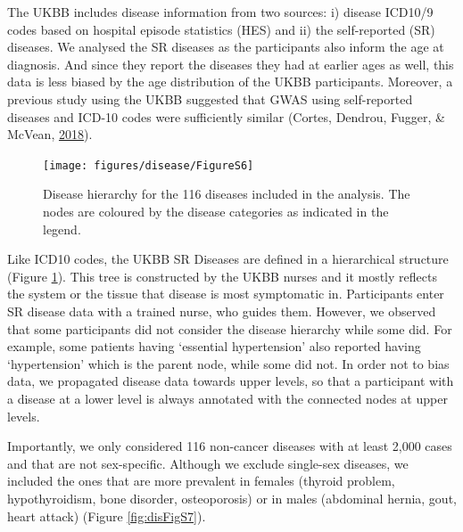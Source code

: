 \documentclass[12pt,twoside]{unicam}
\begin{document}
The UKBB includes disease information from two sources: i) disease ICD10/9 codes based on hospital episode statistics (HES) and ii) the self-reported (SR) diseases. We analysed the SR diseases as the participants also inform the age at diagnosis. And since they report the diseases they had at earlier ages as well, this data is less biased by the age distribution of the UKBB participants. Moreover, a previous study using the UKBB suggested that GWAS using self-reported diseases and ICD-10 codes were sufficiently similar (Cortes, Dendrou, Fugger, \& McVean, \protect\hyperlink{ref-Cortes2018}{2018}).

\begin{figure}

{\centering \texttt{[image: figures/disease/FigureS6]} 

}

\caption[Disease hierarchy for the 116 diseases included in the analysis.]{Disease hierarchy for the 116 diseases included in the analysis. The nodes are coloured by the disease categories as indicated in the legend.}\label{fig:disFigS6}
\end{figure}

Like ICD10 codes, the UKBB SR Diseases are defined in a hierarchical structure (Figure \ref{fig:disFigS6}). This tree is constructed by the UKBB nurses and it mostly reflects the system or the tissue that disease is most symptomatic in. Participants enter SR disease data with a trained nurse, who guides them. However, we observed that some participants did not consider the disease hierarchy while some did. For example, some patients having `essential hypertension' also reported having `hypertension' which is the parent node, while some did not. In order not to bias data, we propagated disease data towards upper levels, so that a participant with a disease at a lower level is always annotated with the connected nodes at upper levels.

Importantly, we only considered 116 non-cancer diseases with at least 2,000 cases and that are not sex-specific. Although we exclude single-sex diseases, we included the ones that are more prevalent in females (thyroid problem, hypothyroidism, bone disorder, osteoporosis) or in males (abdominal hernia, gout, heart attack) (Figure \ref{fig:disFigS7}).
\end{document}

